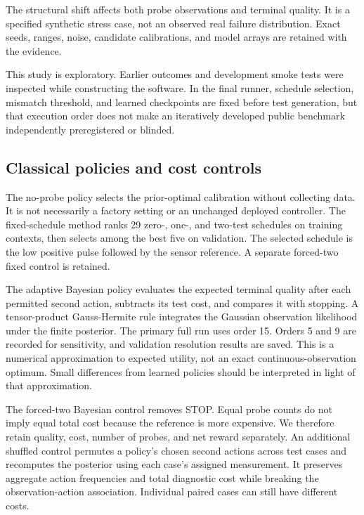 \documentclass[
  10pt,
]{article}
\begin{document}
The structural shift affects both probe observations and terminal
quality. It is a specified synthetic stress case, not an observed real
failure distribution. Exact seeds, ranges, noise, candidate
calibrations, and model arrays are retained with the evidence.

This study is exploratory. Earlier outcomes and development smoke tests
were inspected while constructing the software. In the final runner,
schedule selection, mismatch threshold, and learned checkpoints are
fixed before test generation, but that execution order does not make an
iteratively developed public benchmark independently preregistered or
blinded.

\subsection{Classical policies and cost
controls}\label{classical-policies-and-cost-controls}

The no-probe policy selects the prior-optimal calibration without
collecting data. It is not necessarily a factory setting or an unchanged
deployed controller. The fixed-schedule method ranks 29 zero-, one-, and
two-test schedules on training contexts, then selects among the best
five on validation. The selected schedule is the low positive pulse
followed by the sensor reference. A separate forced-two fixed control is
retained.

The adaptive Bayesian policy evaluates the expected terminal quality
after each permitted second action, subtracts its test cost, and
compares it with stopping. A tensor-product Gauss-Hermite rule
integrates the Gaussian observation likelihood under the finite
posterior. The primary full run uses order 15. Orders 5 and 9 are
recorded for sensitivity, and validation resolution results are saved.
This is a numerical approximation to expected utility, not an exact
continuous-observation optimum. Small differences from learned policies
should be interpreted in light of that approximation.

The forced-two Bayesian control removes STOP. Equal probe counts do not
imply equal total cost because the reference is more expensive. We
therefore retain quality, cost, number of probes, and net reward
separately. An additional shuffled control permutes a policy's chosen
second actions across test cases and recomputes the posterior using each
case's assigned measurement. It preserves aggregate action frequencies
and total diagnostic cost while breaking the observation-action
association. Individual paired cases can still have different costs.
\end{document}
